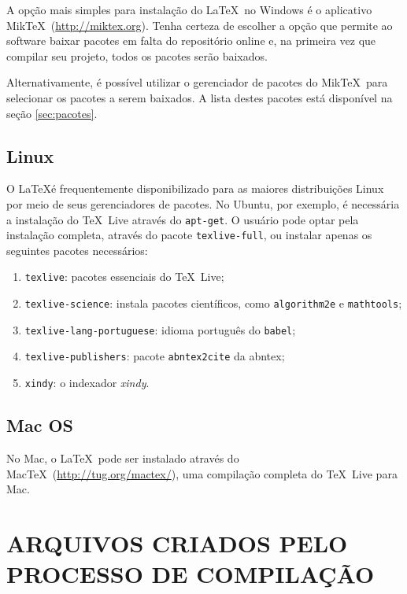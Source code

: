 \documentclass[xindy,draft]{fei}
\begin{document}
	A opção mais simples para instalação do \LaTeX\ no Windows é o aplicativo Mik\TeX\ (\url{http://miktex.org}). Tenha certeza de escolher a opção que permite ao software baixar pacotes em falta do repositório online e, na primeira vez que compilar seu projeto, todos os pacotes serão baixados.
	
	Alternativamente, é possível utilizar o gerenciador de pacotes do Mik\TeX\ para selecionar os pacotes a serem baixados. A lista destes pacotes está disponível na seção \ref{sec:pacotes}.
	
	\section{Linux}
	
	O \LaTeX é frequentemente disponibilizado para as maiores distribuições Linux por meio de seus gerenciadores de pacotes. No Ubuntu, por exemplo, é necessária a instalação do \TeX\ Live através do \texttt{apt-get}. O usuário pode optar pela instalação completa, através do pacote \texttt{texlive-full}, ou instalar apenas os seguintes pacotes necessários:
	
	\begin{enumerate}
	\item \texttt{texlive}: pacotes essenciais do \TeX\ Live;
	\item \texttt{texlive-science}: instala pacotes científicos, como \texttt{algorithm2e} e \texttt{mathtools};
	\item \texttt{texlive-lang-portuguese}: idioma português do \texttt{babel};
	\item \texttt{texlive-publishers}: pacote \texttt{abntex2cite} da \gls{abntex};
	\item {}\texttt{xindy}: o indexador \emph{xindy}.
	\end{enumerate}

	\section{Mac OS}
	
	No Mac, o \LaTeX\ pode ser instalado através do Mac\TeX\ (\url{http://tug.org/mactex/}), uma compilação completa do \TeX\ Live para Mac.

	
	\appendix
	
	\chapter{ARQUIVOS CRIADOS PELO PROCESSO DE COMPILAÇÃO}
	
\end{document}
